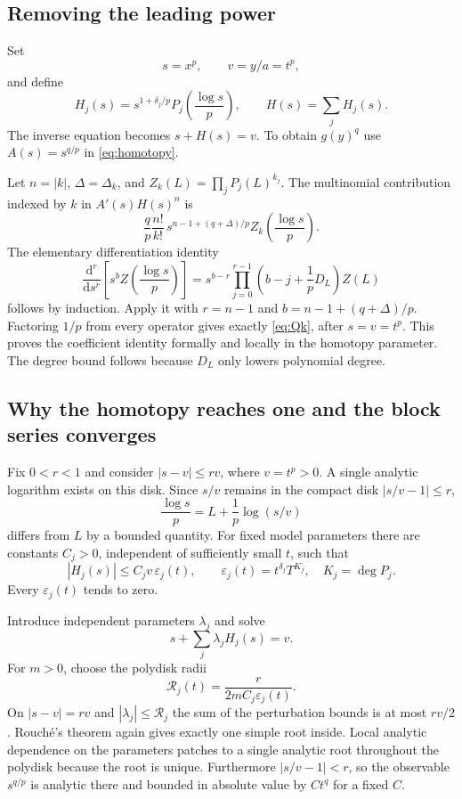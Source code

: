 \documentclass[11pt,a4paper]{article}
\theoremstyle{definition}
\theoremstyle{remark}
\newcommand{\dd}{\mathrm d}
\begin{document}
\subsection{Removing the leading power}

Set
\[
 s=x^p,\qquad v=y/a=t^p,
\]
and define
\[
 H_j(s)=s^{1+\delta_j/p}P_j\!\left(\frac{\log s}{p}\right),
 \qquad H(s)=\sum_jH_j(s).
\]
The inverse equation becomes $s+H(s)=v$. To obtain $g(y)^q$ use
$A(s)=s^{q/p}$ in \eqref{eq:homotopy}.

Let $n=|k|$, $\Delta=\Delta_k$, and
$Z_k(L)=\prod_jP_j(L)^{k_j}$. The multinomial contribution indexed by $k$ in
$A'(s)H(s)^n$ is
\[
 \frac qp\frac{n!}{k!}\,
 s^{n-1+(q+\Delta)/p}Z_k\!\left(\frac{\log s}{p}\right).
\]
The elementary differentiation identity
\begin{equation}\label{eq:derivative-identity}
 \frac{\dd^r}{\dd s^r}\left[s^b Z\!\left(\frac{\log s}{p}\right)\right]
 =s^{b-r}\prod_{j=0}^{r-1}\left(b-j+\frac1pD_L\right)Z(L)
\end{equation}
follows by induction. Apply it with $r=n-1$ and
$b=n-1+(q+\Delta)/p$. Factoring $1/p$ from every operator gives exactly
\eqref{eq:Qk}, after $s=v=t^p$. This proves the coefficient identity formally
and locally in the homotopy parameter. The degree bound follows because
$D_L$ only lowers polynomial degree.

\subsection{Why the homotopy reaches one and the block series converges}

Fix $0<r<1$ and consider $|s-v|\le rv$, where $v=t^p>0$. A single analytic
logarithm exists on this disk. Since $s/v$ remains in the compact disk
$|s/v-1|\le r$,
\[
 \frac{\log s}{p}=L+\frac1p\log(s/v)
\]
differs from $L$ by a bounded quantity. For fixed model parameters there are
constants $C_j>0$, independent of sufficiently small $t$, such that
\begin{equation}\label{eq:Hbound}
 |H_j(s)|\le C_jv\,\varepsilon_j(t),\qquad
 \varepsilon_j(t)=t^{\delta_j}T^{K_j},\quad K_j=\deg P_j.
\end{equation}
Every $\varepsilon_j(t)$ tends to zero.

Introduce independent parameters $\lambda_j$ and solve
\[
 s+\sum_j\lambda_jH_j(s)=v.
\]
For $m>0$, choose the polydisk radii
\[
 \mathcal R_j(t)=\frac{r}{2mC_j\varepsilon_j(t)}.
\]
On $|s-v|=rv$ and $|\lambda_j|\le\mathcal R_j$ the sum of the perturbation
bounds is at most $rv/2$. Rouch\'e's theorem again gives exactly one simple root
inside. Local analytic dependence on the parameters patches to a single
analytic root throughout the polydisk because the root is unique.
Furthermore $|s/v-1|<r$, so the observable $s^{q/p}$ is analytic there and
bounded in absolute value by $C t^q$ for a fixed $C$.
\end{document}
